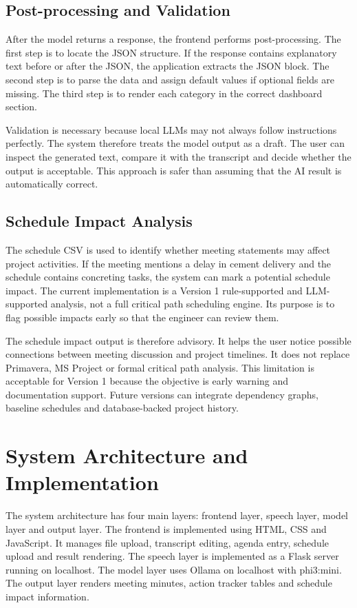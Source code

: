 \documentclass[11pt,a4paper]{article}
\begin{document}
\subsection{Post-processing and Validation}

After the model returns a response, the frontend performs post-processing. The first step is to locate the JSON structure. If the response contains explanatory text before or after the JSON, the application extracts the JSON block. The second step is to parse the data and assign default values if optional fields are missing. The third step is to render each category in the correct dashboard section.

Validation is necessary because local LLMs may not always follow instructions perfectly. The system therefore treats the model output as a draft. The user can inspect the generated text, compare it with the transcript and decide whether the output is acceptable. This approach is safer than assuming that the AI result is automatically correct.

\subsection{Schedule Impact Analysis}

The schedule CSV is used to identify whether meeting statements may affect project activities. If the meeting mentions a delay in cement delivery and the schedule contains concreting tasks, the system can mark a potential schedule impact. The current implementation is a Version 1 rule-supported and LLM-supported analysis, not a full critical path scheduling engine. Its purpose is to flag possible impacts early so that the engineer can review them.

The schedule impact output is therefore advisory. It helps the user notice possible connections between meeting discussion and project timelines. It does not replace Primavera, MS Project or formal critical path analysis. This limitation is acceptable for Version 1 because the objective is early warning and documentation support. Future versions can integrate dependency graphs, baseline schedules and database-backed project history.

\section{System Architecture and Implementation}

The system architecture has four main layers: frontend layer, speech layer, model layer and output layer. The frontend is implemented using HTML, CSS and JavaScript. It manages file upload, transcript editing, agenda entry, schedule upload and result rendering. The speech layer is implemented as a Flask server running on localhost. The model layer uses Ollama on localhost with phi3:mini. The output layer renders meeting minutes, action tracker tables and schedule impact information.
\end{document}
